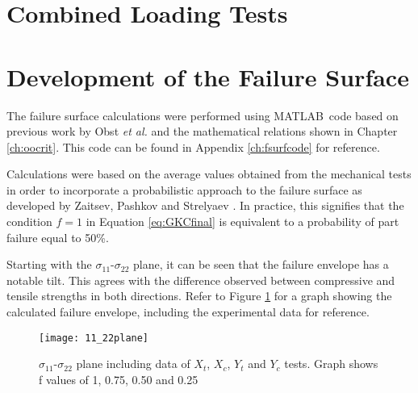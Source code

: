 \documentclass[main.tex]{subfiles}
\begin{document}
\section{Combined Loading Tests} \label{sec:clr}
\section{Development of the Failure Surface} \label{sec:fsc}

The failure surface calculations were performed using MATLAB\textregistered~code based on previous work by Obst \emph{et al.} \cite{Obst2018} and the mathematical relations shown in Chapter \ref{ch:oocrit}. This code can be found in Appendix \ref{ch:fsurfcode} for reference.

Calculations were based on the average values obtained from the mechanical tests in order to incorporate a probabilistic approach to the failure surface as developed by Zaitsev, Pashkov and Strelyaev \cite{Zaitsev1975}. In practice, this signifies that the condition $f=1$ in Equation \ref{eq:GKCfinal} is equivalent to a probability of part failure equal to 50\%.

Starting with the $\sigma_{11}$-$\sigma_{22}$ plane, it can be seen that the failure envelope has a notable tilt. This agrees with the difference observed between compressive and tensile strengths in both directions. Refer to Figure \ref{fig:1122plane} for a graph showing the calculated failure envelope, including the experimental data for reference.

\begin{figure}[!htbp]
	\center
	\texttt{[image: 11\_22plane]}
	\captionsetup{justification=centering} %
	\caption[$\sigma_{11}$-$\sigma_{22}$ plane]{$\sigma_{11}$-$\sigma_{22}$ plane including data of $X_t$, $X_c$, $Y_t$ and $Y_c$ tests. Graph shows f values of 1, 0.75, 0.50 and 0.25} \label{fig:1122plane}
\end{figure}

  

% 

\end{document}
